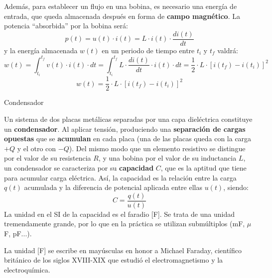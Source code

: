 \documentclass[11pt]{book} %
\makeatletter
\numberwithin{dummy}{section}
\theoremstyle{ocrenumbox}
\theoremstyle{blacknumex}
\theoremstyle{blacknumbox}
\theoremstyle{ocrenum}
\newenvironment{remark}{\par\vspace{10pt}\small %
\begin{list}{}{
\leftmargin=35pt %
\rightmargin=25pt}\item\ignorespaces %
\makebox[-2.5pt]{\begin{tikzpicture}[overlay]
\node[draw=ocre!60,line width=1pt,circle,fill=ocre!25,font=\sffamily\bfseries,inner sep=2pt,outer sep=0pt] at (-15pt,0pt){\textcolor{ocre}{N}};\end{tikzpicture}} %
\advance\baselineskip -1pt}{\end{list}\vskip5pt} %
\renewcommand{\subsubsection}{\@startsection {subsubsection}{3}{\z@}
{-2ex \@plus -0.1ex \@minus -.2ex}
{.2ex \@plus.2ex }
{\normalfont\small\sffamily\bfseries}}
\newlength\esp
\makeatother
\begin{document}
	Además, para establecer un flujo en una bobina, es necesario una energía de entrada, que queda almacenada después en forma de \textbf{campo magnético}. La potencia ``absorbida'' por la bobina será:
	\begin{equation*}
		p(t)=u(t)\cdot i(t)=L\cdot i(t)\cdot\dfrac{di(t)}{dt}
	\end{equation*}
	y la energía almacenada $w(t)$ en un periodo de tiempo entre $t_i$ y $t_f$ valdrá:
	\begin{equation*}
		w(t)=\int_{t_i}^{t_f}v(t)\cdot i(t)\cdot dt=\int_{t_i}^{t_f}L\cdot\dfrac{di(t)}{dt}\cdot i(t)\cdot dt=\dfrac{1}{2}\cdot L\cdot [i(t_f)-i(t_i)]^2
	\end{equation*}
	\begin{equation}
		\boxed{w(t)=\dfrac{1}{2}\cdot L\cdot [i(t_f)-i(t_i)]^2}
	\end{equation}
	
	\subsubsection{Condensador}\label{sec.condensador}
	
	Un sistema de dos placas metálicas separadas por una capa dieléctrica constituye un \textbf{condensador}. Al aplicar tensión, produciendo una \textbf{separación de cargas opuestas} que se \textbf{acumulan} en cada placa (una de las placas queda con la carga $+Q$ y el otro con $-Q$). Del mismo modo que un elemento resistivo se distingue por el valor de su resistencia $R$, y una bobina por el valor de su inductancia $L$, un condensador se caracteriza por su \textbf{capacidad} $C$, que es la aptitud que tiene para acumular carga eléctrica. Así, la capacidad es la relación entre la carga $q(t)$ acumulada y la diferencia de potencial aplicada entre ellas $u(t)$, siendo:
	\begin{equation}\label{eq.cqu}
		\boxed{C=\dfrac{q(t)}{u(t)}}
	\end{equation}
	La unidad en el SI de la capacidad es el faradio [F]. Se trata de una unidad tremendamente grande, por lo que en la práctica se utilizan submúltiplos (mF, $\mu$F, pF...). 
	\begin{remark}
		La unidad [F] se escribe en mayúsculas en honor a Michael Faraday, científico británico de los siglos XVIII-XIX que estudió el electromagnetismo y la electroquímica. 
	\end{remark}
	
\end{document}
